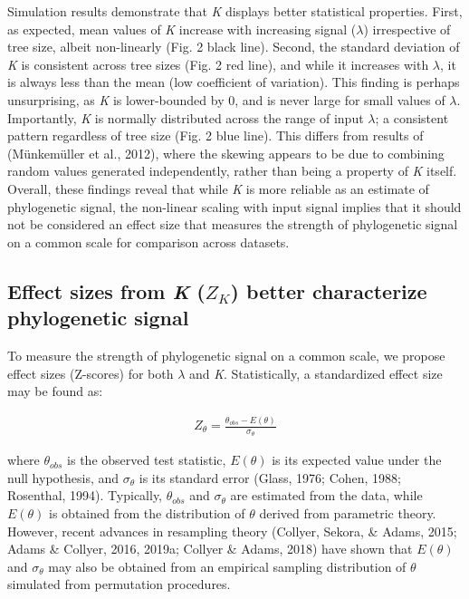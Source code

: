 \documentclass[
]{article}
\begin{document}
Simulation results demonstrate that \emph{K} displays better statistical
properties. First, as expected, mean values of \emph{K} increase with
increasing signal (\(\lambda\)) irrespective of tree size, albeit
non-linearly (Fig. 2 black line). Second, the standard deviation of
\emph{K} is consistent across tree sizes (Fig. 2 red line), and while it
increases with \(\lambda\), it is always less than the mean (low
coefficient of variation). This finding is perhaps unsurprising, as
\emph{K} is lower-bounded by 0, and is never large for small values of
\(\lambda\). Importantly, \emph{K} is normally distributed across the
range of input \(\lambda\); a consistent pattern regardless of tree size
(Fig. 2 blue line). This differs from results of (Münkemüller et al.,
2012), where the skewing appears to be due to combining random values
generated independently, rather than being a property of \emph{K}
itself. Overall, these findings reveal that while \emph{K} is more
reliable as an estimate of phylogenetic signal, the non-linear scaling
with input signal implies that it should not be considered an effect
size that measures the strength of phylogenetic signal on a common scale
for comparison across datasets.

\hypertarget{effect-sizes-from-k-z_k-better-characterize-phylogenetic-signal}{%
\subsection{\texorpdfstring{Effect sizes from \emph{K} (\(Z_K\)) better
characterize phylogenetic
signal}{Effect sizes from K (Z\_K) better characterize phylogenetic signal}}\label{effect-sizes-from-k-z_k-better-characterize-phylogenetic-signal}}

To measure the strength of phylogenetic signal on a common scale, we
propose effect sizes (Z-scores) for both \(\lambda\) and \emph{K}.
Statistically, a standardized effect size may be found as:

\begin{align}
    Z_{\theta}=\frac{\theta_{obs}-E(\theta)}{\sigma_\theta}
\end{align}

where \(\theta_{obs}\) is the observed test statistic, \(E(\theta)\) is
its expected value under the null hypothesis, and \(\sigma_\theta\) is
its standard error (Glass, 1976; Cohen, 1988; Rosenthal, 1994).
Typically, \(\theta_{obs}\) and \(\sigma_\theta\) are estimated from the
data, while \(E(\theta)\) is obtained from the distribution of
\(\theta\) derived from parametric theory. However, recent advances in
resampling theory (Collyer, Sekora, \& Adams, 2015; Adams \& Collyer,
2016, 2019a; Collyer \& Adams, 2018) have shown that \(E(\theta)\) and
\(\sigma_\theta\) may also be obtained from an empirical sampling
distribution of \(\theta\) simulated from permutation procedures.
\hfill\break
\end{document}
